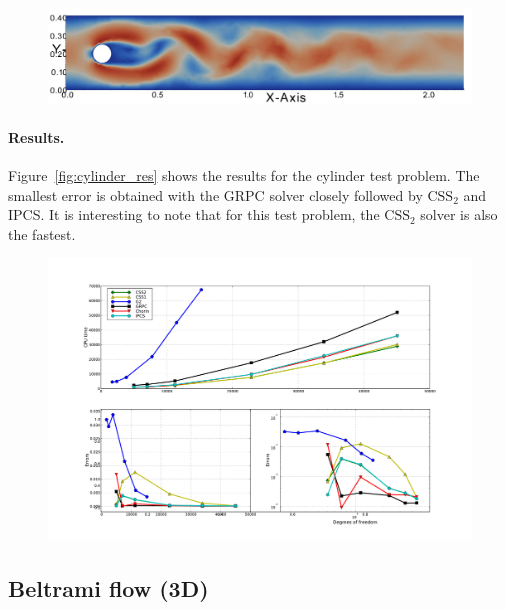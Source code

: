 \begin{figure}
  {\includegraphics[width=\fullfig]{chapters/kvs-1/pdf/cylinderandgeoattime5nr2.pdf}}
\end{figure}

\paragraph{Results.}

Figure~\ref{fig:cylinder_res} shows the results for the cylinder test
problem. The smallest error is obtained with the GRPC solver closely
followed by $\mathrm{CSS}_2$ and IPCS. It is interesting to note that
for this test problem, the $\mathrm{CSS}_2$ solver is also the
fastest.

\begin{figure}
  {\includegraphics[width=\fullfig]{chapters/kvs-1/pdf/new_cylinder_res.pdf}}
\end{figure}

\subsection{Beltrami flow (3D)}

